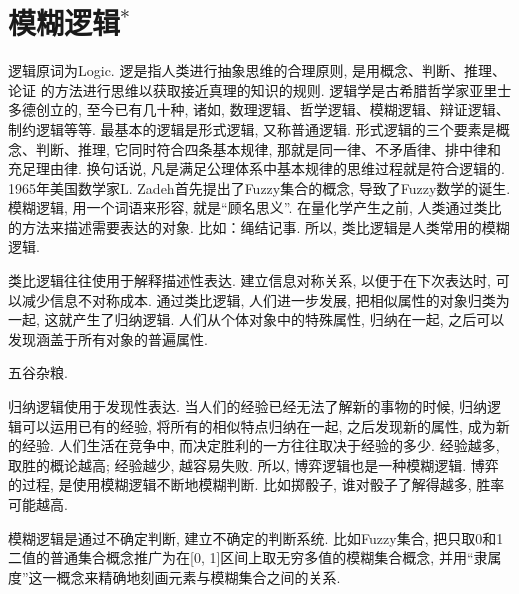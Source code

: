 \section{模糊逻辑$^*$}
逻辑原词为Logic. 逻是指人类进行抽象思维的合理原则, 是用概念、判断、推理、论证 的方法进行思维以获取接近真理的知识的规则. 逻辑学是古希腊哲学家亚里士多德创立的, 至今已有几十种, 诸如, 数理逻辑、哲学逻辑、模糊逻辑、辩证逻辑、制约逻辑等等. 最基本的逻辑是形式逻辑, 又称普通逻辑. 形式逻辑的三个要素是概念、判断、推理, 它同时符合四条基本规律, 那就是同一律、不矛盾律、排中律和充足理由律. 换句话说, 凡是满足公理体系中基本规律的思维过程就是符合逻辑的.
1965年美国数学家L. Zadeh首先提出了Fuzzy集合的概念, 导致了Fuzzy数学的诞生.
模糊逻辑, 用一个词语来形容, 就是“顾名思义”. 在量化学产生之前, 人类通过类比的方法来描述需要表达的对象. 比如：绳结记事. 所以, 类比逻辑是人类常用的模糊逻辑.

类比逻辑往往使用于解释描述性表达. 建立信息对称关系, 以便于在下次表达时, 可以减少信息不对称成本.
通过类比逻辑, 人们进一步发展, 把相似属性的对象归类为一起, 这就产生了归纳逻辑. 人们从个体对象中的特殊属性, 归纳在一起, 之后可以发现涵盖于所有对象的普遍属性.
\begin{example}
  五谷杂粮.
\end{example}

归纳逻辑使用于发现性表达. 当人们的经验已经无法了解新的事物的时候, 归纳逻辑可以运用已有的经验, 将所有的相似特点归纳在一起, 之后发现新的属性, 成为新的经验.
人们生活在竞争中, 而决定胜利的一方往往取决于经验的多少. 经验越多, 取胜的概论越高; 经验越少, 越容易失败. 所以, 博弈逻辑也是一种模糊逻辑. 博弈的过程, 是使用模糊逻辑不断地模糊判断. 比如掷骰子, 谁对骰子了解得越多, 胜率可能越高.

模糊逻辑是通过不确定判断, 建立不确定的判断系统. 比如Fuzzy集合, 把只取0和1二值的普通集合概念推广为在[0, 1]区间上取无穷多值的模糊集合概念, 并用“隶属度”这一概念来精确地刻画元素与模糊集合之间的关系.

